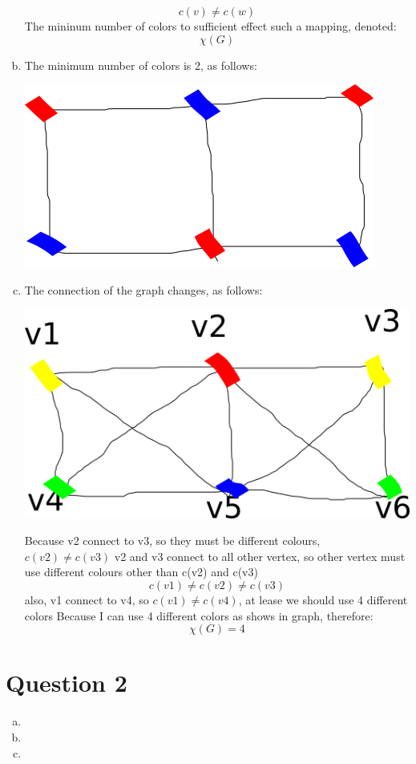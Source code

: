 \documentclass[11pt, a4paper]{article}
\begin{document}
\begin{enumerate}[(a)]
    $$ c(v) \ne c(w) $$
    The mininum number of colors to sufficient effect such a mapping, denoted:
    $$ \chi(G) $$
    \item
    The minimum number of colors is 2, as follows:\\
    \begin{center}
        \includegraphics[scale=0.7]{q1b1}
    \end{center}
    \item
    The connection of the graph changes, as follows:\\
    \begin{center}
        \includegraphics[scale=0.7]{q1c1}
    \end{center}
    Because v2 connect to v3, so they must be different colours, $c(v2) \ne c(v3)$
    v2 and v3 connect to all other vertex, so other vertex must use different colours other than c(v2) and c(v3)
    $$c(v1) \ne c(v2) \ne c(v3)$$
    also, v1 connect to v4, so $c(v1) \ne c(v4)$, at lease we should use 4 different colors
    Because I can use 4 different colors as shows in graph, therefore:
    $$ \chi(G) = 4 $$
\end{enumerate}

\section*{Question 2}
\begin{enumerate}[(a)]
    \item


    \item


    \item
\end{enumerate}
\end{document}

